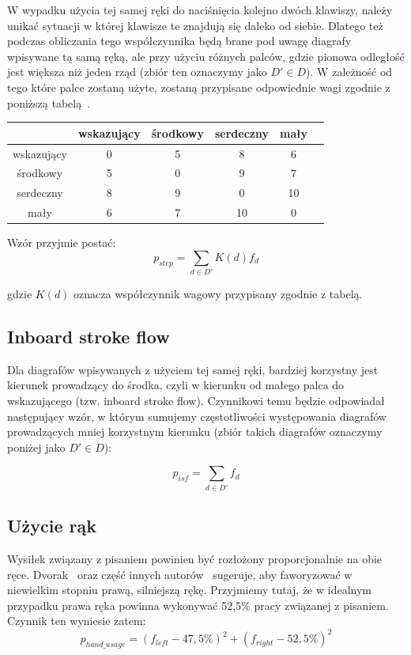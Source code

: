 \documentclass[brudnopis]{xmgr}
\begin{document}
W wypadku użycia tej samej ręki do naciśnięcia kolejno dwóch klawiszy, należy unikać sytuacji w której klawisze te znajdują się daleko od siebie. Dlatego też podczas obliczania tego współczynnika będą brane pod uwagę diagrafy wpisywane tą samą ręką, ale przy użyciu różnych palców, gdzie pionowa odległość jest większa niż jeden rząd (zbiór ten oznaczymy jako $ D' \in D $). W zależność od tego które palce zostaną użyte, zostaną przypisane odpowiednie wagi zgodnie z poniższą tabelą~\cite{Eggers2003672}.\newline

\begin{tabular}{ c | c | c | c | c | c }
  & wskazujący & środkowy & serdeczny & mały \\
  \hline
  wskazujący & 0 & 5 & 8 & 6 \\
  środkowy & 5 & 0 & 9 & 7 \\
  serdeczny & 8 & 9 & 0 & 10 \\
  mały & 6 & 7 & 10 & 0 \\
\end{tabular}\newline\newline

Wzór przyjmie postać:
$$ p_{step} = \sum\limits_{d \in D'} K(d) f_d $$

gdzie $K(d)$ oznacza współczynnik wagowy przypisany zgodnie z tabelą.


\subsection{Inboard stroke flow}

Dla diagrafów wpisywanych z użyciem tej samej ręki, bardziej korzystny jest kierunek prowadzący do środka, czyli w kierunku od małego palca do wskazującego (tzw. inboard stroke flow). Czynnikowi temu będzie odpowiadał następujący wzór, w którym sumujemy częstotliwości występowania diagrafów prowadzących mniej korzystnym kierunku (zbiór takich diagrafów oznaczymy poniżej jako $ D' \in D $):

$$ p_{isf} = \sum\limits_{d \in D'} f_d $$


\subsection{Użycie rąk}

Wysiłek związany z pisaniem powinien być rozłożony proporcjonalnie na obie ręce. Dvorak~\cite{cassingham1986dvorak} oraz część innych autorów~\cite{Call:2005:CME} sugeruje, aby faworyzować w niewielkim stopniu prawą, silniejszą rękę. Przyjmiemy tutaj, że w idealnym przypadku prawa ręka powinna wykonywać 52,5\% pracy związanej z pisaniem. Czynnik ten wyniesie zatem:
$$ p_{hand\_usage} = (f_{left} - 47,5\%)^2 + (f_{right} - 52,5\%)^2 $$
\end{document}
